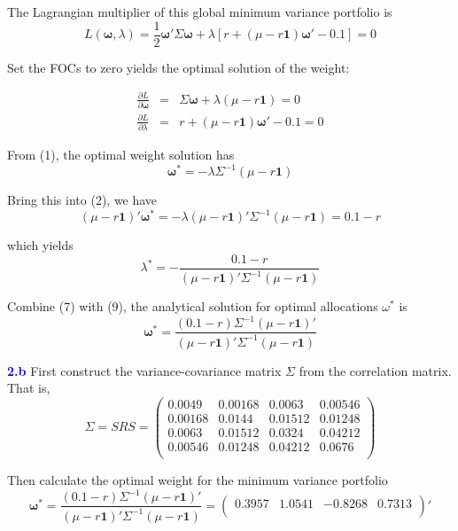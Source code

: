 \documentclass[a4paper,11pt] {article}
\begin{document}
The Lagrangian multiplier of this global minimum variance portfolio is
$$
L(\mathbf{\omega}, \lambda) = \frac{1}{2}\mathbf{\omega}'\Sigma\mathbf{\omega} + \lambda[r + (\mu-r\mathbf{1})\mathbf{\omega}' - 0.1] = 0
$$

Set the FOCs to zero yields the optimal solution of the weight:

\begin{eqnarray}
\frac{\partial L}{\partial \mathbf{\omega}} &=& \Sigma \mathbf{\omega} + \lambda (\mu-r\mathbf{1}) = 0 \\
\frac{\partial L}{\partial \lambda} &=& r + (\mu-r\mathbf{1})\mathbf{\omega}' - 0.1 = 0
\end{eqnarray}

From (1), the optimal weight solution has
\begin{equation}
\mathbf{\omega}^* = -\lambda \Sigma^{-1} (\mu-r\mathbf{1})
\end{equation}

Bring this into (2), we have
\begin{equation}
(\mu-r\mathbf{1})'\mathbf{\omega}^{*} = -\lambda (\mu-r\mathbf{1})'\Sigma^{-1}(\mu-r\mathbf{1}) = 0.1-r
\end{equation}

which yields
\begin{equation}
\lambda^* = -\frac{0.1-r}{(\mu-r\mathbf{1})'\Sigma^{-1}(\mu-r\mathbf{1})}
\end{equation}

Combine (7) with (9), the analytical solution for optimal allocations $\omega^*$ is
$$
\mathbf{\omega}^* = \frac{(0.1-r)\Sigma^{-1}(\mu-r\mathbf{1})'}{(\mu-r\mathbf{1})'\Sigma^{-1}(\mu-r\mathbf{1})}
$$

\textcolor{blue}{\bf 2.b } First construct the variance-covariance matrix $\Sigma$ from the correlation matrix. That is,
$$
\Sigma = SRS =
\left(
  \begin{array}{cccc}
0.0049	&	0.00168	&	0.0063	&	0.00546	\\
0.00168	&	0.0144	&	0.01512	&	0.01248	\\
0.0063	&	0.01512	&	0.0324	&	0.04212	\\
0.00546	&	0.01248	&	0.04212	&	0.0676	\\
  \end{array}
\right)
$$

Then calculate the optimal weight for the minimum variance portfolio
$$
\mathbf{\omega}^* = \frac{(0.1-r)\Sigma^{-1}(\mu-r\mathbf{1})'}{(\mu-r\mathbf{1})'\Sigma^{-1}(\mu-r\mathbf{1})} =
\left(
  \begin{array}{cccc}
    0.3957 & 1.0541 & -0.8268 & 0.7313 \\
  \end{array}
\right)'
$$
\end{document}
